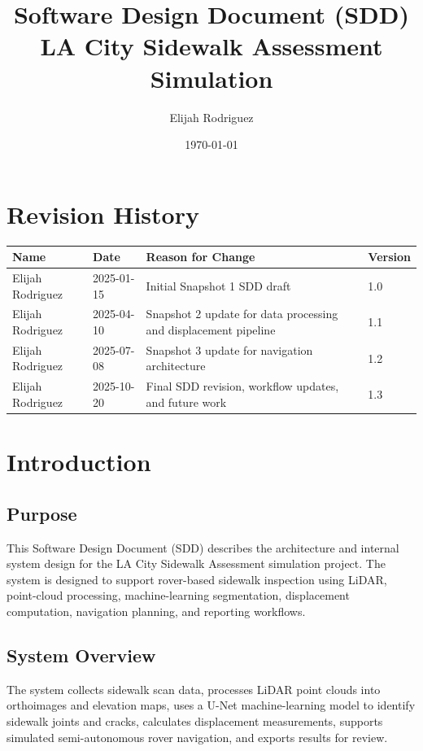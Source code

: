 \documentclass{article}
\title{Software Design Document (SDD)\\LA City Sidewalk Assessment Simulation}
\author{Elijah Rodriguez}
\date{\today}
\begin{document}
\maketitle
\tableofcontents
\newpage

\section{Revision History}

\begin{longtable}{|p{1.5in}|p{1in}|p{2.5in}|p{1in}|}
\hline
Name & Date & Reason for Change & Version \\ \hline
Elijah Rodriguez & 2025-01-15 & Initial Snapshot 1 SDD draft & 1.0 \\ \hline
Elijah Rodriguez & 2025-04-10 & Snapshot 2 update for data processing and displacement pipeline & 1.1 \\ \hline
Elijah Rodriguez & 2025-07-08 & Snapshot 3 update for navigation architecture & 1.2 \\ \hline
Elijah Rodriguez & 2025-10-20 & Final SDD revision, workflow updates, and future work & 1.3 \\ \hline
\end{longtable}

\section{Introduction}

\subsection{Purpose}

This Software Design Document (SDD) describes the architecture and internal system design for the LA City Sidewalk Assessment simulation project. The system is designed to support rover-based sidewalk inspection using LiDAR, point-cloud processing, machine-learning segmentation, displacement computation, navigation planning, and reporting workflows.

\subsection{System Overview}

The system collects sidewalk scan data, processes LiDAR point clouds into orthoimages and elevation maps, uses a U-Net machine-learning model to identify sidewalk joints and cracks, calculates displacement measurements, supports simulated semi-autonomous rover navigation, and exports results for review.
\end{document}
